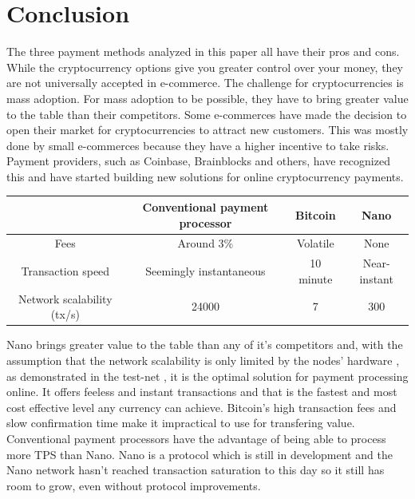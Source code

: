 \documentclass{ferseminar}
\begin{document}
\section{Conclusion}
The three payment methods analyzed in this paper all have their pros and cons. While the cryptocurrency options give you greater control over your money, they are not universally accepted in e-commerce. The challenge for cryptocurrencies is mass adoption. For mass adoption to be possible, they have to bring greater value to the table than their competitors. Some e-commerces have made the decision to open their market for cryptocurrencies to attract new customers. This was mostly done by small e-commerces because they have a higher incentive to take risks. Payment providers, such as Coinbase, Brainblocks and others, have recognized this and have started building new solutions for online cryptocurrency payments.


\begin{center}
	\begin{tabular}{ |c||c|c|c| }
		\hline
		& Conventional payment processor & Bitcoin & Nano\\ 
		\hline\hline
		Fees & Around 3\% & Volatile & None\\  
		\hline
		Transaction speed & Seemingly instantaneous & 10 minute & Near-instant\\
		\hline
		Network scalability (tx/s) & 24000 & 7 & 300\\
		\hline
	\end{tabular}
\end{center}

Nano brings greater value to the table than any of it's competitors and, with the assumption that the network scalability is only limited by the nodes' hardware \cite{Nano}, as demonstrated in the test-net \cite{github}, it is the optimal solution for payment processing online. It offers feeless and instant transactions and that is the fastest and most cost effective level any currency can achieve.
Bitcoin's high transaction fees and slow confirmation time make it impractical to use for transfering value. 
Conventional payment processors have the advantage of being able to process more TPS than Nano. Nano is a protocol which is still in development and the Nano network hasn't reached transaction saturation to this day so it still has room to grow, even without protocol improvements. 
\end{document}
